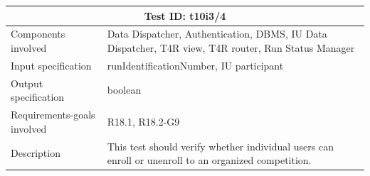 \begin{table}[H]
\centering
\begin{tabular}{ |p{4.5cm}||p{11cm}|  }
 \hline
 \multicolumn{2}{|c|}{Test ID: t10i3/4} \\
 \hline 
 Components involved  	&    Data Dispatcher, Authentication, DBMS, IU Data Dispatcher, T4R view, T4R router, Run Status Manager\\
 Input specification  	&  	 runIdentificationNumber, IU participant\\
Output specification  	& 	  	boolean\\
Requirements-goals involved & R18.1, R18.2-G9    \\
Description  	& 	 	   This test should verify whether individual users can enroll or unenroll to an organized competition.\\
 \hline
\end{tabular}
\end{table}



